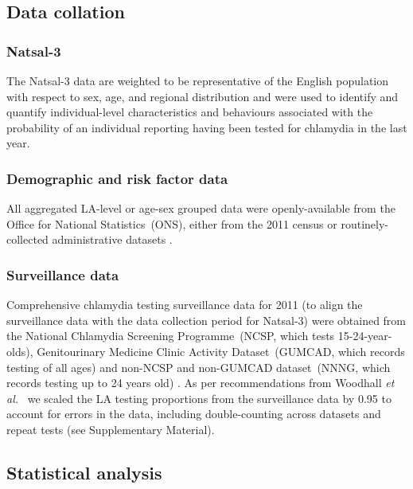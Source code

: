 \documentclass[fleqn,10pt]{wlscirep}
\begin{document}
\subsection*{Data collation}

\subsubsection*{Natsal-3}
The Natsal-3 data are weighted to be representative of the English population with respect to sex, age, and regional distribution \cite{Mercer2013,Erens2014b} and were used to identify and quantify individual-level characteristics and behaviours associated with the probability of an individual reporting having been tested for chlamydia in the last year.

\subsubsection*{Demographic and risk factor data}
All aggregated LA-level or age-sex grouped data were openly-available from the Office for National Statistics~(ONS), either from the 2011 census \cite{ONS_cesnsusdata} or routinely-collected administrative datasets \cite{OfficeforNationalStatistics2011, OfficeforNationalStatistics2011a, DepartmentforCommunitiesandLocalGovernment, ONS_conceptions, ONS_urbanrural}.

\subsubsection*{Surveillance data}
Comprehensive chlamydia testing surveillance data for 2011 (to align the surveillance data with the data collection period for Natsal-3) were obtained from the National Chlamydia Screening Programme~(NCSP, which tests 15-24-year-olds), Genitourinary Medicine Clinic Activity Dataset~(GUMCAD, which records testing of all ages) and non-NCSP and non-GUMCAD dataset~(NNNG, which records testing up to 24 years old) \cite{PublicHealthEngland}. As per recommendations from Woodhall {\it et al.}~\cite{Woodhall2013} we scaled the LA testing proportions from the surveillance data by 0.95 to account for errors in the data, including double-counting across datasets and repeat tests (see Supplementary Material).

\subsection*{Statistical analysis}
\end{document}
